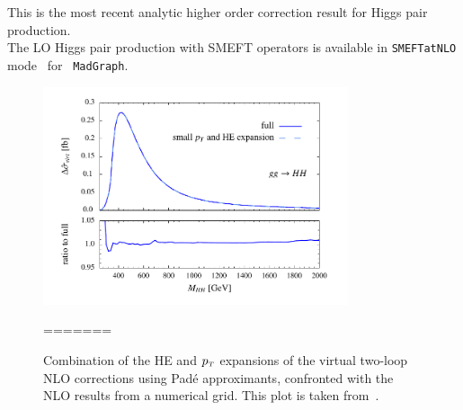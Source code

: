 This is the most recent analytic higher order correction result for Higgs pair production.\\
%
The LO Higgs pair production with SMEFT operators is available in \texttt{SMEFTatNLO} mode~\cite{Degrande:2020evl} for ~\texttt{MadGraph}.

\begin{figure}[!htpb]
	\centering
	\includegraphics[width = 0.8\textwidth]{./figures/HH_NLO}
	\caption{Combination of the HE and $p_{\scriptscriptstyle T}$ expansions of the virtual two-loop NLO corrections using  Pad\'e  approximants,  confronted with the NLO results from a numerical grid. This plot is taken from~\cite{Bellafronte:2022jmo}. } 
=======

\end{figure}
